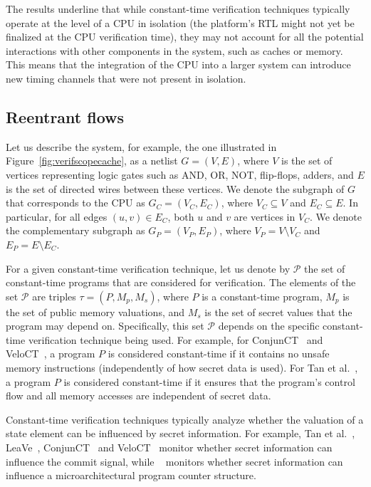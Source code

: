 The results underline that while constant-time verification techniques typically operate at the level of a CPU in isolation (the platform's RTL might not yet be finalized at the CPU verification time), they may not account for all the potential interactions with other components in the system, such as caches or memory.
This means that the integration of the CPU into a larger system can introduce new timing channels that were not present in isolation.

\subsection{Reentrant flows}

Let us describe the system, for example, the one illustrated in Figure~\ref{fig:verifscopecache}, as a netlist $G = (V, E)$, where $V$ is the set of vertices representing logic gates such as AND, OR, NOT, flip-flops, adders, and $E$ is the set of directed wires between these vertices.
We denote the subgraph of $G$ that corresponds to the CPU as $G_C = (V_C, E_C)$, where $V_C \subseteq V$ and $E_C \subseteq E$.
In particular, for all edges $(u, v) \in E_C$, both $u$ and $v$ are vertices in $V_C$.
We denote the complementary subgraph as $G_{P} = (V_{P}, E_{P})$, where $V_{P} = V \setminus V_C$ and $E_{P} = E \setminus E_C$.

For a given constant-time verification technique, let us denote by $\mathcal{P}$ the set of constant-time programs that are considered for verification.
The elements of the set $\mathcal{P}$ are triples $\tau = (P, M_p, M_s)$, where $P$ is a constant-time program, $M_p$ is the set of public memory valuations, and $M_s$ is the set of secret values that the program may depend on.
Specifically, this set $\mathcal{P}$ depends on the specific constant-time verification technique being used.
For example, for ConjunCT~\cite{dinesh2024conjunct} and VeloCT~\cite{dinesh2025h}, a program $P$ is considered constant-time if it contains no unsafe memory instructions (independently of how secret data is used).
For Tan et al.~\cite{tan2025contractshadowlogic}, a program $P$ is considered constant-time if it ensures that the program's control flow and all memory accesses are independent of secret data.

Constant-time verification techniques typically analyze whether the valuation of a state element can be influenced by secret information.
For example, Tan et al.~\cite{tan2025contractshadowlogic}, LeaVe~\cite{wang2023specification}, ConjunCT~\cite{dinesh2024conjunct} and VeloCT~\cite{dinesh2025h} monitor whether secret information can influence the commit signal, while \ucfi~\cite{ceesay2024mucfi} monitors whether secret information can influence a microarchitectural program counter structure.

